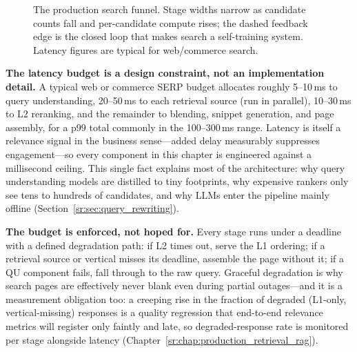 \begin{figure}[H]
\caption{The production search funnel. Stage widths narrow as candidate counts fall and per-candidate compute rises; the dashed feedback edge is the closed loop that makes search a self-training system. Latency figures are typical for web/commerce search.}
\label{sr:fig:search_funnel}
\end{figure}

\textbf{The latency budget is a design constraint, not an implementation detail.} A typical web or commerce SERP budget allocates roughly 5--10\,ms to query understanding, 20--50\,ms to each retrieval source (run in parallel), 10--30\,ms to L2 reranking, and the remainder to blending, snippet generation, and page assembly, for a p99 total commonly in the 100--300\,ms range. Latency is itself a relevance signal in the business sense---added delay measurably suppresses engagement---so every component in this chapter is engineered against a millisecond ceiling. This single fact explains most of the architecture: why query understanding models are distilled to tiny footprints, why expensive rankers only see tens to hundreds of candidates, and why LLMs enter the pipeline mainly offline (Section~\ref{sr:sec:query_rewriting}).

\textbf{The budget is enforced, not hoped for.} Every stage runs under a deadline with a defined degradation path: if L2 times out, serve the L1 ordering; if a retrieval source or vertical misses its deadline, assemble the page without it; if a QU component fails, fall through to the raw query. Graceful degradation is why search pages are effectively never blank even during partial outages---and it is a measurement obligation too: a creeping rise in the fraction of degraded (L1-only, vertical-missing) responses is a quality regression that end-to-end relevance metrics will register only faintly and late, so degraded-response rate is monitored per stage alongside latency (Chapter~\ref{sr:chap:production_retrieval_rag}).

